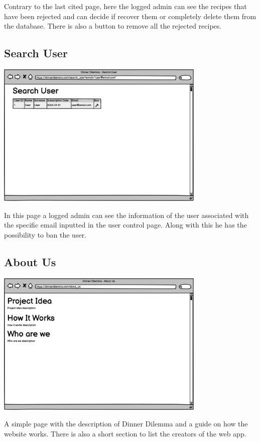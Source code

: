 Contrary to the last cited page, here the logged admin can see the recipes that have been rejected and can decide if recover them or completely delete them from the database.
There is also a button to remove all the rejected recipes.



\subsection{Search User}
\includegraphics[width=0.75\textwidth]{images/searchuser.png}

In this page a logged admin can see the information of the user associated with the specific email inputted in the user control page. Along with this he has the possibility to ban the user.


\subsection{About Us}
\includegraphics[width=0.75\textwidth]{images/aboutus.png}

A simple page with the description of Dinner Dilemma and a guide on how the website works. There is also a short section to list the creators of the web app.

